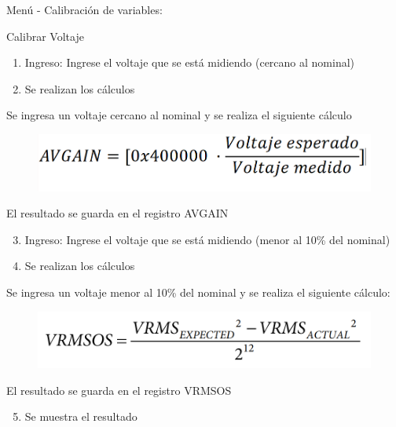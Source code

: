 Menú - Calibración de variables:

Calibrar Voltaje
\begin{enumerate}
\item Ingreso: Ingrese el voltaje que se está midiendo (cercano al nominal)
\item Se realizan los cálculos
\end{enumerate}

Se ingresa un voltaje cercano al nominal y se realiza el siguiente cálculo

\begin{figure}[!htb]
	\centering
	\includegraphics[width=\textwidth , keepaspectratio]{Figures/ApendixA/ec1.png}
	\label{fig:ecu1A}
\end{figure}

El resultado se guarda en el registro AVGAIN 


\begin{enumerate}
\setcounter{enumi}{2}
\item Ingreso: Ingrese el voltaje que se está midiendo (menor al 10\% del nominal)
\item Se realizan los cálculos
\end{enumerate}

Se ingresa un voltaje menor al 10\% del nominal y se realiza el siguiente cálculo:

\begin{figure}[!htb]
	\centering
	\includegraphics[width=\textwidth , keepaspectratio]{Figures/ApendixA/ec2.png}
	\label{fig:ecu2A}
\end{figure}

El resultado se guarda en el registro VRMSOS

\begin{enumerate}
\setcounter{enumi}{4}
\item Se muestra el resultado
\end{enumerate}



